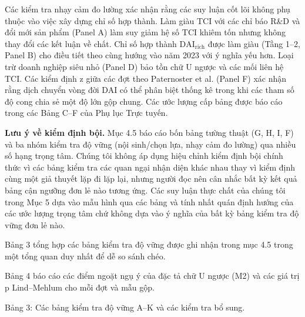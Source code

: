 \documentclass[12pt,a4paper]{article}
\begin{document}
Các kiểm tra nhạy cảm đo lường xác nhận rằng các suy luận cốt lõi không
phụ thuộc vào việc xây dựng chỉ số hợp thành. Làm giàu TCI với các chỉ
báo R\&D và đổi mới sản phẩm (Panel A) làm suy giảm hệ số TCI khiêm tốn
nhưng không thay đổi các kết luận về chất. Chỉ số hợp thành
\(\mathrm{DAI}_{\text{rich}}\) được làm giàu (Tầng 1--2, Panel B) cho
điều tiết theo cùng hướng vào năm 2023 với ý nghĩa yếu hơn. Loại trừ
doanh nghiệp siêu nhỏ (Panel D) bảo tồn chữ U ngược và các mối liên hệ
TCI. Các kiểm định z giữa các đợt theo Paternoster et al. (Panel F) xác
nhận rằng dịch chuyển vòng đời DAI có thể phân biệt thống kê trong khi
các tham số độ cong chia sẻ một độ lớn gộp chung. Các ước lượng cấp bảng
được báo cáo trong các Bảng C--F của Phụ lục Trực tuyến.

\textbf{Lưu ý về kiểm định bội.} Mục 4.5 báo cáo bốn bảng tường thuật
(G, H, I, F) và ba nhóm kiểm tra độ vững (nội sinh/chọn lựa, nhạy cảm đo
lường) qua nhiều số hạng trọng tâm. Chúng tôi không áp dụng hiệu chỉnh
kiểm định bội chính thức vì các bảng kiểm tra các quan ngại nhận diện
khác nhau thay vì kiểm định cùng một giả thuyết lặp đi lặp lại, nhưng
người đọc nên cân nhắc bất kỳ kết quả bảng cận ngưỡng đơn lẻ nào tương
ứng. Các suy luận thực chất của chúng tôi trong Mục 5 dựa vào mẫu hình
qua các bảng và tính nhất quán định hướng của các ước lượng trọng tâm
chứ không dựa vào ý nghĩa của bất kỳ bảng kiểm tra độ vững đơn lẻ nào.

Bảng 3 tổng hợp các bảng kiểm tra độ vững được ghi nhận trong mục 4.5
trong một tổng quan duy nhất để dễ so sánh chéo.

Bảng 4 báo cáo các điểm ngoặt ngụ ý của đặc tả chữ U ngược (M2) và các
giá trị p Lind--Mehlum cho mỗi đợt và mẫu gộp.

Bảng 3: Các bảng kiểm tra độ vững A--K và các kiểm tra bổ sung.
\end{document}
